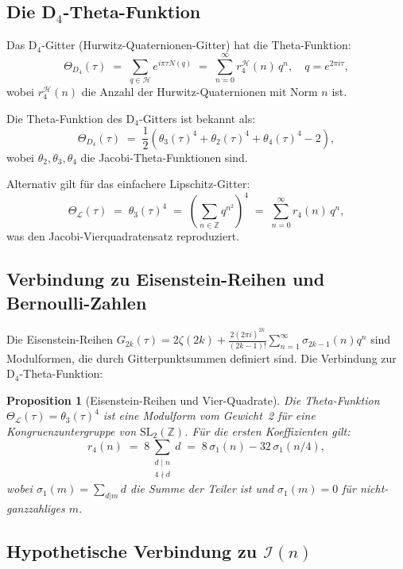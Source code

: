 \documentclass[12pt,a4paper]{article}
\newtheorem{proposition}[definition]{Proposition}
\newcommand{\Z}{\mathbb{Z}}
\newcommand{\In}{\mathcal{I}}
\begin{document}
\subsection{Die D${}_4$-Theta-Funktion}

Das D${}_4$-Gitter (Hurwitz-Quaternionen-Gitter) hat die Theta-Funktion:
\[
  \Theta_{D_4}(\tau) \;=\; \sum_{q \in \mathcal{H}} e^{i\pi\tau N(q)}
  \;=\; \sum_{n=0}^{\infty} r_4^{\mathcal{H}}(n)\, q^n,
  \quad q = e^{2\pi i \tau},
\]
wobei $r_4^{\mathcal{H}}(n)$ die Anzahl der Hurwitz-Quaternionen mit Norm $n$ ist.

Die Theta-Funktion des D${}_4$-Gitters ist bekannt als:
\[
  \Theta_{D_4}(\tau) \;=\; \frac{1}{2}\left(\theta_3(\tau)^4 + \theta_2(\tau)^4 + \theta_4(\tau)^4 - 2\right),
\]
wobei $\theta_2, \theta_3, \theta_4$ die Jacobi-Theta-Funktionen sind.

Alternativ gilt für das einfachere Lipschitz-Gitter:
\[
  \Theta_{\mathcal{L}}(\tau) \;=\; \theta_3(\tau)^4
  \;=\; \left(\sum_{n \in \Z} q^{n^2}\right)^4
  \;=\; \sum_{n=0}^{\infty} r_4(n)\, q^n,
\]
was den Jacobi-Vierquadratensatz reproduziert.

\subsection{Verbindung zu Eisenstein-Reihen und Bernoulli-Zahlen}

Die Eisenstein-Reihen $G_{2k}(\tau) = 2\zeta(2k) + \frac{2(2\pi i)^{2k}}{(2k-1)!}
\sum_{n=1}^\infty \sigma_{2k-1}(n) q^n$ sind Modulformen, die durch Gitterpunktsummen
definiert sind. Die Verbindung zur D${}_4$-Theta-Funktion:

\begin{proposition}[Eisenstein-Reihen und Vier-Quadrate]
\label{prop:eisenstein}
Die Theta-Funktion $\Theta_{\mathcal{L}}(\tau) = \theta_3(\tau)^4$ ist eine
Modulform vom Gewicht~2 für eine Kongruenzuntergruppe von $\mathrm{SL}_2(\Z)$.
Für die ersten Koeffizienten gilt:
\[
  r_4(n) \;=\; 8 \sum_{\substack{d \mid n \\ 4 \nmid d}} d
          \;=\; 8\,\sigma_1(n) - 32\,\sigma_1(n/4),
\]
wobei $\sigma_1(m) = \sum_{d|m} d$ die Summe der Teiler ist und $\sigma_1(m) = 0$
für nicht-ganzzahliges $m$.
\end{proposition}

\subsection{Hypothetische Verbindung zu \texorpdfstring{$\In(n)$}{I(n)}}
\end{document}
